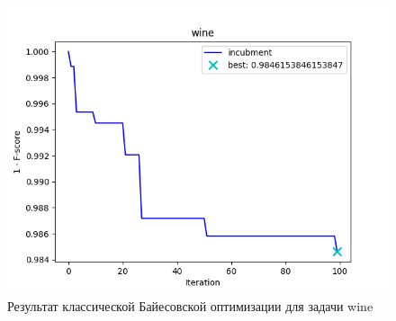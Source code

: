 \documentclass[times,specification,annotation]{itmo-student-thesis}
\begin{document}
	\begin{figure}[!ht]
	\caption{Результат классической Байесовской оптимизации для задачи wine}\label{img:bo}
	\includegraphics[width=0.85\linewidth]{wine}
	\centering
\end{figure}
\end{document}

